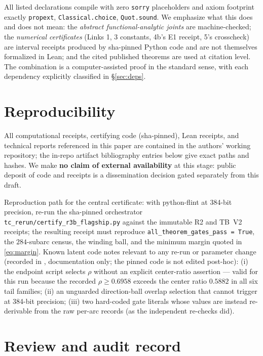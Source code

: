 \documentclass[11pt]{article}
\theoremstyle{definition}
\theoremstyle{remark}
\begin{document}
All listed declarations compile with zero \texttt{sorry} placeholders
and axiom footprint exactly \texttt{propext},
\texttt{Classical.choice}, \texttt{Quot.sound}. We emphasize what this
does and does not mean: the \emph{abstract functional-analytic joints}
are machine-checked; the \emph{numerical certificates} (Links 1, 3
constants, 4b's E1 receipt, 5's crosscheck) are interval receipts
produced by sha-pinned Python code and are not themselves formalized in
Lean; and the cited published theorems are used at citation level. The
combination is a computer-assisted proof in the standard sense, with
each dependency explicitly classified in \S\ref{sec:deps}.

\appendix

\section{Reproducibility}
\label{app:repro}

All computational receipts, certifying code (sha-pinned), Lean
receipts, and technical reports referenced in this paper are contained
in the authors' working repository; the in-repo artifact bibliography
entries below give exact paths and hashes. We make \textbf{no claim of
external availability} at this stage: public deposit of code and
receipts is a dissemination decision gated separately from this draft.

Reproduction path for the central certificate: with python-flint at
384-bit precision, re-run the sha-pinned orchestrator
\texttt{tc\_rerun/certify\_r3b\_flagship.py} against the immutable R2
and TB~V2 receipts; the resulting receipt must reproduce
\texttt{all\_theorem\_gates\_pass = True}, the $284$-subarc census, the
winding ball, and the minimum margin quoted in \eqref{eq:margin}.
Known latent code notes relevant to any re-run or parameter change
(recorded in \cite{R3bReport}, documentation only; the pinned code is
not edited post-hoc): (i) the endpoint script selects $\rho$ without an
explicit center-ratio assertion --- valid for this run because the
recorded $\rho \ge 0.6958$ exceeds the center ratio $0.5882$ in all six
tail families; (ii) an unguarded direction-ball overlap selection that
cannot trigger at 384-bit precision; (iii) two hard-coded gate literals
whose values are instead re-derivable from the raw per-arc records (as
the independent re-checks did).

\section{Review and audit record}
\label{app:review}
\end{document}
